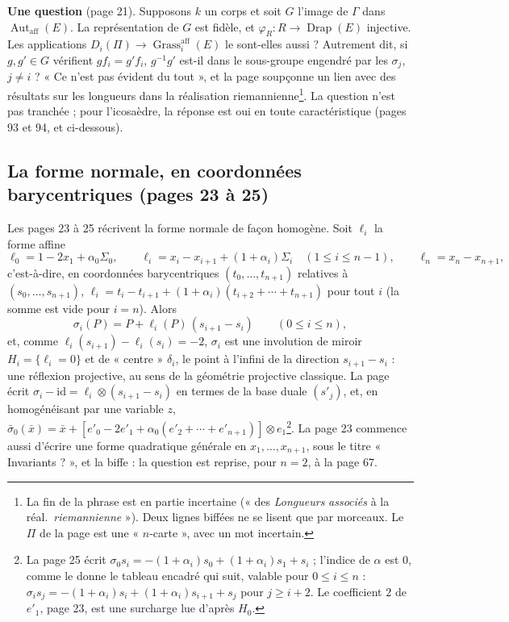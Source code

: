 \documentclass[11pt,a4paper]{article}
\begin{document}
\textbf{Une question} (page 21). Supposons $k$ un corps et soit $G$ l'image de
$\Gamma$ dans $\operatorname{Aut}_{\mathrm{aff}}(E)$. La représentation de $G$ est fidèle,
et $\varphi_R : R \to \operatorname{Drap}(E)$ injective. Les applications $D_i(\Pi)
\to \operatorname{Grass}_i^{\mathrm{aff}}(E)$ le sont-elles aussi ? Autrement
dit, si $g, g' \in G$ vérifient $g f_i = g' f_i$, $g^{-1} g'$ est-il dans le
sous-groupe engendré par les $\sigma_j$, $j \neq i$ ? « Ce n'est pas évident du
tout », et la page soupçonne un lien avec des résultats sur les longueurs dans
la réalisation riemannienne\footnote{La fin de la phrase est en partie
incertaine (« des \emph{Longueurs} \emph{associés} à la réal.\
\emph{riemannienne} »). Deux lignes biffées ne se lisent que par morceaux. Le
$\Pi$ de la page est une « $n$-carte », avec un mot incertain.}. La question
n'est pas tranchée ; pour l'icosaèdre, la réponse est oui en toute
caractéristique (pages 93 et 94, et ci-dessous).

\subsection*{La forme normale, en coordonnées barycentriques (pages 23 à 25)}

Les pages 23 à 25 récrivent la forme normale de façon homogène. Soit $\ell_i$
la forme affine
\[
\ell_0 = 1 - 2x_1 + \alpha_0\Sigma_0, \qquad
\ell_i = x_i - x_{i+1} + (1 + \alpha_i)\Sigma_i \quad (1 \leq i \leq n-1),
\qquad \ell_n = x_n - x_{n+1} ,
\]
c'est-à-dire, en coordonnées barycentriques $(t_0, \dots, t_{n+1})$ relatives à
$(s_0, \dots, s_{n+1})$, $\ell_i = t_i - t_{i+1} + (1 + \alpha_i)(t_{i+2} +
\cdots + t_{n+1})$ pour tout $i$ (la somme est vide pour $i = n$). Alors
\[
\sigma_i(P) = P + \ell_i(P)\,(s_{i+1} - s_i) \qquad (0 \leq i \leq n) ,
\]
et, comme $\ell_i(s_{i+1}) - \ell_i(s_i) = -2$, $\sigma_i$ est une involution
de miroir $H_i = \{\ell_i = 0\}$ et de « centre » $\delta_i$, le point à
l'infini de la direction $s_{i+1} - s_i$ : une réflexion projective, au sens
de la géométrie projective classique. La page écrit
$\sigma_i - \mathrm{id} = \ell_i \otimes (s_{i+1} - s_i)$ en termes de la base
duale $(s'_j)$, et, en homogénéisant par une variable $z$, $\bar\sigma_0(\bar
x) = \bar x + [e'_0 - 2e'_1 + \alpha_0(e'_2 + \cdots + e'_{n+1})] \otimes
e_1$\footnote{La page 25 écrit $\sigma_0 s_i = -(1 + \alpha_i)s_0 + (1 +
\alpha_i)s_1 + s_i$ ; l'indice de $\alpha$ est $0$, comme le donne le tableau
encadré qui suit, valable pour $0 \leq i \leq n$ : $\sigma_i s_j = -(1 +
\alpha_i)s_i + (1 + \alpha_i)s_{i+1} + s_j$ pour $j \geq i + 2$. Le coefficient
$2$ de $e'_1$, page 23, est une surcharge lue d'après $H_0$.}.
La page 23 commence aussi d'écrire une forme quadratique générale en $x_1,
\dots, x_{n+1}$, sous le titre « Invariants ? », et la biffe : la question est
reprise, pour $n = 2$, à la page 67.
\end{document}
